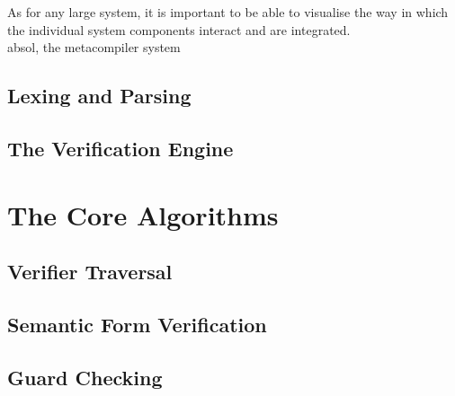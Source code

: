 As for any large system, it is important to be able to visualise the way in which the individual system components interact and are integrated. \\

\gls{absol}, the metacompiler system 

\subsection{Lexing and Parsing} %
\label{sub:lexing_and_parsing}


\subsection{The Verification Engine} %
\label{sub:the_verification_engine}



\section{The Core Algorithms} %
\label{sec:the_core_algorithms}

\subsection{Verifier Traversal} %
\label{sub:verifier_traversal}


\subsection{Semantic Form Verification} %
\label{sub:semantic_form_verification}


\subsection{Guard Checking} %
\label{sub:guard_checking}

